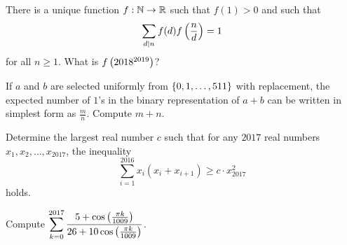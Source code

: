 \documentclass[11pt,paper=letter]{scrartcl}
\begin{document}
\begin{mdframed}[style=exmdbox,frametitle={},  frametitlebelowskip = 0pt,splittopskip = 0pt,  innertopmargin = 5pt,]

\begin{problem}
  There is a unique function $f : \mathbb N \to \mathbb R$ such that $f(1) > 0$ and such that 
  $$\sum_{d \mid n} f(d)f\left( \frac nd \right) = 1$$
  for all $n \geq 1$. What is $f\left( 2018^{2019} \right)$? \hint{\ref{h:14}}
\end{problem}


\begin{problem}
  If $a$ and $b$ are selected uniformly from $\left\{ 0, 1, \ldots, 511 \right\}$ with replacement, the expected number of $1$'s in the binary representation of $a+b$ can be written in simplest form as $\frac mn$. Compute $m + n$.
\end{problem}

\begin{problem}
  Determine the largest real number $c$ such that for any $2017$ real numbers $x_1, x_2, \ldots, x_{2017}$, the inequality
  $$\sum_{i=1}^{2016} x_i(x_i + x_{i+1}) \geq c \cdot x^2_{2017}$$
  holds.
\end{problem}

\begin{problem}
  Compute $\displaystyle \sum_{k=0}^{2017} \dfrac{5 + \cos\left( \frac{\pi k}{1009} \right)}{26 + 10\cos\left( \frac{\pi k}{1009} \right)}$. \hint{\ref{h:15}}
\end{problem}

\end{mdframed}

\end{document}
